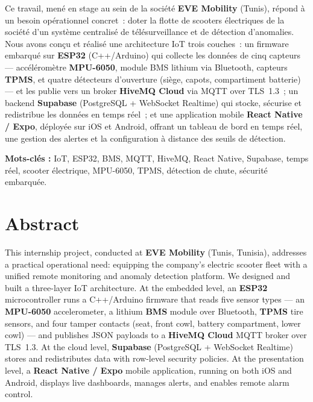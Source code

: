 \documentclass[12pt, a4paper]{report}
\begin{document}
Ce travail, mené en stage au sein de la société \textbf{EVE Mobility} (Tunis), répond à
un besoin opérationnel concret~: doter la flotte de scooters électriques de la société
d'un système centralisé de télésurveillance et de détection d'anomalies. Nous avons
conçu et réalisé une architecture IoT trois couches~: un firmware embarqué sur
\textbf{ESP32} (C++/Arduino) qui collecte les données de cinq capteurs --- accéléromètre
\textbf{MPU-6050}, module BMS lithium via Bluetooth, capteurs \textbf{TPMS}, et quatre
détecteurs d'ouverture (siège, capots, compartiment batterie) --- et les publie vers
un broker \textbf{HiveMQ Cloud} via MQTT over TLS~1.3~; un backend \textbf{Supabase}
(PostgreSQL + WebSocket Realtime) qui stocke, sécurise et redistribue les données en
temps réel~; et une application mobile \textbf{React Native / Expo}, déployée sur iOS
et Android, offrant un tableau de bord en temps réel, une gestion des alertes et la
configuration à distance des seuils de détection.

\vspace{0.5cm}
\textbf{Mots-clés :} IoT, ESP32, BMS, MQTT, HiveMQ, React Native, Supabase, temps réel,
scooter électrique, MPU-6050, TPMS, détection de chute, sécurité embarquée.

\chapter*{Abstract}
\thispagestyle{fancy}

This internship project, conducted at \textbf{EVE Mobility} (Tunis, Tunisia), addresses
a practical operational need: equipping the company's electric scooter fleet with a
unified remote monitoring and anomaly detection platform. We designed and built a
three-layer IoT architecture. At the embedded level, an \textbf{ESP32} microcontroller
runs a C++/Arduino firmware that reads five sensor types --- an \textbf{MPU-6050}
accelerometer, a lithium \textbf{BMS} module over Bluetooth, \textbf{TPMS} tire sensors,
and four tamper contacts (seat, front cowl, battery compartment, lower cowl) --- and
publishes JSON payloads to a \textbf{HiveMQ Cloud} MQTT broker over TLS~1.3. At the
cloud level, \textbf{Supabase} (PostgreSQL + WebSocket Realtime) stores and
redistributes data with row-level security policies. At the presentation level, a
\textbf{React Native / Expo} mobile application, running on both iOS and Android,
displays live dashboards, manages alerts, and enables remote alarm control.
\end{document}

